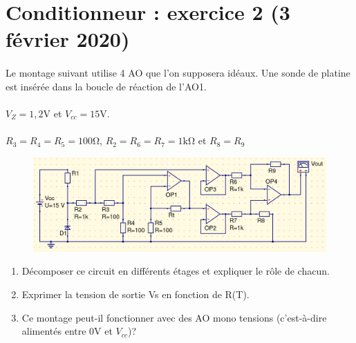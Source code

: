 \documentclass{article}
\begin{document}

\newpage
\section{Conditionneur : exercice 2 (3 février 2020)}
\paragraph{}
Le montage suivant utilise 4 AO que l'on supposera idéaux. Une sonde de platine est insérée dans la boucle de réaction de l'AO1.

\paragraph{}
$V_Z = 1,2\si{\volt}$ et $V_{cc} = 15\si{\volt}$.

\paragraph{}
$R_3 = R_4 = R_5 = 100\si{\ohm}$, $R_2 = R_6 = R_7 = 1\si{\kilo\ohm}$ et $R_8 = R_9$

\begin{figure}[H]
    \centering
    \includegraphics[width=\linewidth]{./images/cond2.png}
\end{figure}

\begin{enumerate}
    \item Décomposer ce circuit en différents étages et expliquer le rôle de chacun.
    \item Exprimer la tension de sortie Vs en fonction de R(T).
    \item Ce montage peut-il fonctionner avec des AO mono tensions (c’est-à-dire alimentés entre 0\si{\volt} et $V_{cc}$)?
\end{enumerate}
\end{document}
